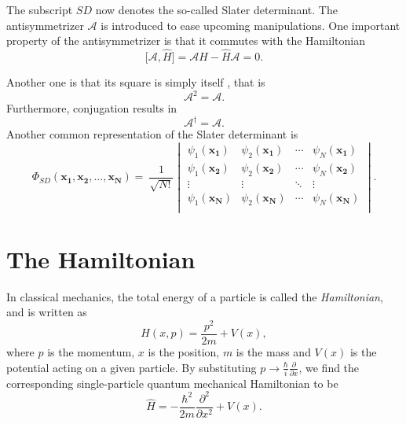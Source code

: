 The subscript $SD$ now denotes the so-called Slater determinant. The
antisymmetrizer $\mathcal{A}$ is introduced to ease upcoming
manipulations. One important property of the antisymmetrizer is that
it commutes with the Hamiltonian \cite{hh4480}
\begin{equation}
 \big[ \mathcal{A}, \hat{H} \big] = \mathcal{A}\hat{H} - \hat{H}\mathcal{A} = 0.
\label{eqn:antisymm_commute}
\end{equation}

Another one is that its square is simply itself \cite{hh4480}, that is
\begin{equation}
 \mathcal{A}^2 =  \mathcal{A}. 
\label{eqn:antisymm_square}
\end{equation}
Furthermore, conjugation results in
\begin{equation}
 \mathcal{A}^\dagger =  \mathcal{A}. 
\label{eqn:antisymm_conjugate}
\end{equation}
Another common representation of the Slater determinant is \cite{ShavittBartlett2009}
\begin{equation}
\Phi_{SD} (\mathbf{x_1},\mathbf{x_2},...,\mathbf{x_N}) =  \
\frac{1}{\sqrt{N!}}
 \begin{vmatrix}
  \psi_1(\mathbf{x_1}) & \psi_2(\mathbf{x_1}) & \cdots & \psi_N(\mathbf{x_1}) \\
  \psi_1(\mathbf{x_2}) & \psi_2(\mathbf{x_2}) & \cdots & \psi_N(\mathbf{x_2}) \\
  \vdots               & \vdots               & \ddots & \vdots               \\
  \psi_1(\mathbf{x_N}) & \psi_2(\mathbf{x_N}) & \cdots & \psi_N(\mathbf{x_N}) \\
 \end{vmatrix}.
\label{eqn:slaterlinalg}
\end{equation}


\section{The Hamiltonian}

In classical mechanics, the total energy of a particle is called the \emph{Hamiltonian}, and is written as \cite{Griffiths2005}
\begin{equation}
H(x,p) = \frac{p^2}{2m} + V(x),
\label{eqn:classical_hamiltonian}
\end{equation}
where $p$ is the momentum, $x$ is the position, $m$ is the mass and
$V(x)$ is the potential acting on a given particle.  By substituting
$p \rightarrow \frac{\hbar}{i} \frac{\partial}{\partial x}$, we find
the corresponding single-particle quantum mechanical Hamiltonian to
be \cite{Griffiths2005}
\begin{equation}
\hat{H} = -\frac{\hbar^2}{2m} \frac{\partial^2}{\partial x^2} + V(x).
\label{eqn:quantum_hamiltonian}
\end{equation}

